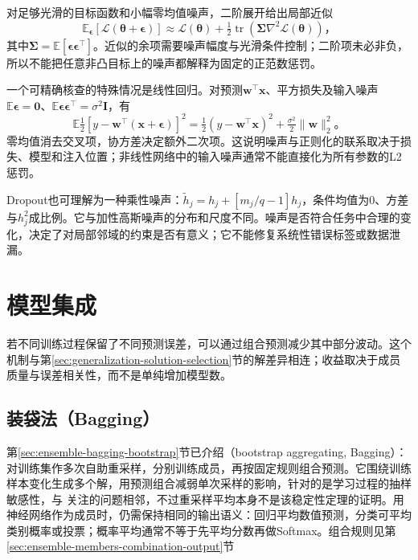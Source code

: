 对足够光滑的目标函数和小幅零均值噪声，二阶展开给出局部近似
\begin{equation}
  \mathbb E_{\bm\epsilon}[\mathcal L(\bm\theta+\bm\epsilon)]
  \approx\mathcal L(\bm\theta)+\tfrac12
      \operatorname{tr}(\bm\Sigma\nabla^2\mathcal L(\bm\theta))\text{，}
  \label{eq:generalization-noise-expansion}
\end{equation}
其中$\bm\Sigma=\mathbb E[\bm\epsilon\bm\epsilon^{\top}]$。近似的余项需要噪声幅度与光滑条件控制；二阶项未必非负，所以不能把任意非凸目标上的噪声都解释为固定的正范数惩罚。

一个可精确核查的特殊情况是线性回归。对预测$\bm w^{\top}\bm x$、平方损失及输入噪声$\mathbb E\bm\epsilon=\bm0$、$\mathbb E\bm\epsilon\bm\epsilon^{\top}=\sigma^2\bm I$，有
\begin{equation}
  \mathbb E\tfrac12[y-\bm w^{\top}(\bm x+\bm\epsilon)]^2
  =\tfrac12(y-\bm w^{\top}\bm x)^2+\tfrac{\sigma^2}{2}\lVert\bm w\rVert_2^2\text{。}
  \label{eq:generalization-linear-noise}
\end{equation}
零均值消去交叉项，协方差决定额外二次项。这说明噪声与正则化的联系取决于损失、模型和注入位置；非线性网络中的输入噪声通常不能直接化为所有参数的L2惩罚。

Dropout也可理解为一种乘性噪声：$\tilde h_j=h_j+[m_j/q-1]h_j$，条件均值为0、方差与$h_j^2$成比例。它与加性高斯噪声的分布和尺度不同。噪声是否符合任务中合理的变化，决定了对局部邻域的约束是否有意义；它不能修复系统性错误标签或数据泄漏。

\section{模型集成}
\label{sec:generalization-ensembles}

若不同训练过程保留了不同预测误差，可以通过组合预测减少其中部分波动。这个机制与第\ref{sec:generalization-solution-selection}节的解差异相连；收益取决于成员质量与误差相关性，而不是单纯增加模型数。

\subsection{装袋法（Bagging）}
\label{sec:generalization-bagging}

第\ref{sec:ensemble-bagging-bootstrap}节已介绍（bootstrap aggregating, Bagging）：对训练集作多次自助重采样，分别训练成员，再按固定规则组合预测。它围绕训练样本变化生成多个解，用预测组合减弱单次采样的影响，针对的是学习过程的抽样敏感性，与
关注的问题相邻，不过重采样平均本身不是该稳定性定理的证明。用神经网络作为成员时，仍需保持相同的输出语义：回归平均数值预测，分类可平均类别概率或投票；概率平均通常不等于先平均分数再做Softmax。组合规则见第\ref{sec:ensemble-members-combination-output}节

